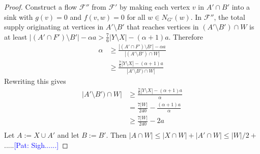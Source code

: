\documentclass{patmorin}
\newcommand{\pat}[1]{\textcolor{Blue}{[Pat: #1]}}
\DeclareMathOperator{\sep}{sn}
\begin{document}
\begin{proof}
    
    Construct a flow $\mathcal{F}''$ from $\mathcal{F}'$ by making each vertex $v$ in $A'\cap B'$ into a sink with $g(v)=0$ and $f(v,w)=0$ for all $w\in N_{G'}(w)$.   
    In $\mathcal{F}''$, the total supply originating at vertices in $A'\setminus B'$ that reaches vertices in $(A'\setminus B')\cap W$ is at least $|(A'\cap F')\setminus B'|-\alpha a>\frac{7}{6}|Y\setminus X|-(\alpha+1)a$.  Therefore
    \begin{align*}
      \alpha & \ge \frac{|(A'\cap F')\setminus B'|-\alpha a}{|(A'\setminus B')\cap W|} \\
      & \ge \frac{\tfrac{7}{6}|Y\setminus X|-(\alpha+1) a}{|A'\setminus B')\cap W|}
    \end{align*}
    Rewriting this gives
    \begin{align*}
      |A'\setminus B')\cap W| & \ge \frac{\tfrac{7}{6}|Y\setminus X|-(\alpha+1) a}{\alpha} \\
      & = \frac{7|W|}{240} - \frac{(\alpha+1)a}{\alpha} \\
      & \ge \frac{7|W|}{240} - 2a \\
    \end{align*}
    Let $A:=X\cup A'$ and let $B:=B'$.  Then $|A\cap W|\le |X\cap W| +|A'\cap W|\le |W|/2+$.....\pat{Sigh......}
\end{proof}






\end{document}
